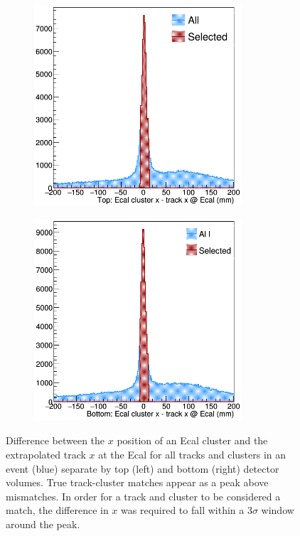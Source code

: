 \begin{figure}[t!h]
    \begin{subfigure}{.5\textwidth}
        \centering
        \includegraphics[width=0.85\textwidth]{images/20160502_pass4_cluster_track_delta_x_top.png}
    \end{subfigure}
    \begin{subfigure}{.5\textwidth}
        \centering
        \includegraphics[width=0.85\textwidth]{images/20160502_pass4_cluster_track_delta_x.png}
    \end{subfigure}
    \caption{Difference between the $x$ position of an Ecal cluster and the 
             extrapolated track $x$ at the Ecal for all tracks and clusters in 
             an event (blue) separate by top (left) and bottom (right) detector
             volumes.  True track-cluster matches appear as a peak 
             above mismatches.  In order for a track and cluster to be considered
             a match, the difference in $x$ was required to fall within a 3$\sigma$
             window around the peak.}
    \label{fig:track_cluster_delta_x}
\end{figure}

